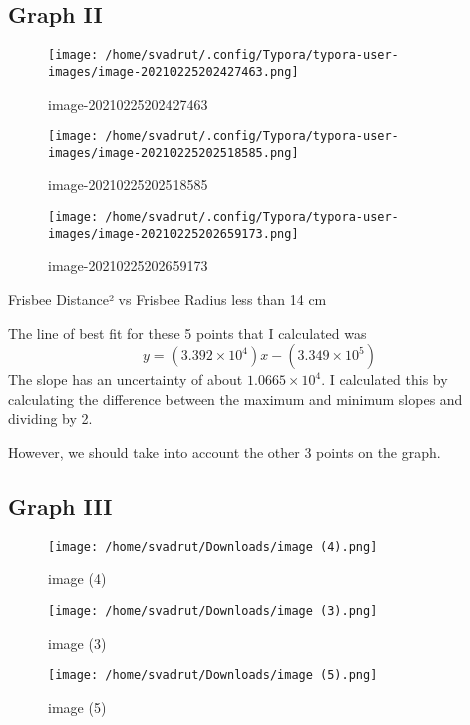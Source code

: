 \documentclass{article}
\begin{document}
\hypertarget{graph-ii}{%
\subsection{Graph II}\label{graph-ii}}

\begin{figure}
\centering
\texttt{[image: /home/svadrut/.config/Typora/typora-user-images/image-20210225202427463.png]}
\caption{image-20210225202427463}
\end{figure}

\begin{figure}
\centering
\texttt{[image: /home/svadrut/.config/Typora/typora-user-images/image-20210225202518585.png]}
\caption{image-20210225202518585}
\end{figure}

\begin{figure}
\centering
\texttt{[image: /home/svadrut/.config/Typora/typora-user-images/image-20210225202659173.png]}
\caption{image-20210225202659173}
\end{figure}

Frisbee Distance² vs Frisbee Radius less than 14 cm

The line of best fit for these 5 points that I calculated was \[
y = (3.392 \times10^4)x - (3.349 \times10^5)
\] The slope has an uncertainty of about \(1.0665 \times 10^4\). I
calculated this by calculating the difference between the maximum and
minimum slopes and dividing by 2.

However, we should take into account the other 3 points on the graph.

\subsection{Graph III}\label{graph-iii}

\begin{figure}
\centering
\texttt{[image: /home/svadrut/Downloads/image (4).png]}
\caption{image (4)}
\end{figure}

\begin{figure}
\centering
\texttt{[image: /home/svadrut/Downloads/image (3).png]}
\caption{image (3)}
\end{figure}

\begin{figure}
\centering
\texttt{[image: /home/svadrut/Downloads/image (5).png]}
\caption{image (5)}
\end{figure}
\end{document}
